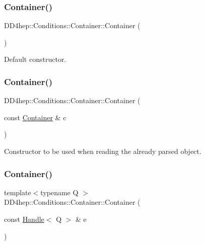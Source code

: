 \subsubsection{\texorpdfstring{Container()}{Container()}\hspace{0.1cm}{\footnotesize\ttfamily [1/3]}}
{\footnotesize\ttfamily D\+D4hep\+::\+Conditions\+::\+Container\+::\+Container (\begin{DoxyParamCaption}{ }\end{DoxyParamCaption})\hspace{0.3cm}{\ttfamily [default]}}



Default constructor. 

\hypertarget{class_d_d4hep_1_1_conditions_1_1_container_aafd4287ec4d43cc16b8ac5591ec4e75e}{}\label{class_d_d4hep_1_1_conditions_1_1_container_aafd4287ec4d43cc16b8ac5591ec4e75e} 
\subsubsection{\texorpdfstring{Container()}{Container()}\hspace{0.1cm}{\footnotesize\ttfamily [2/3]}}
{\footnotesize\ttfamily D\+D4hep\+::\+Conditions\+::\+Container\+::\+Container (\begin{DoxyParamCaption}\item[{const \hyperlink{class_d_d4hep_1_1_conditions_1_1_container}{Container} \&}]{c }\end{DoxyParamCaption})\hspace{0.3cm}{\ttfamily [default]}}



Constructor to be used when reading the already parsed object. 

\hypertarget{class_d_d4hep_1_1_conditions_1_1_container_a830ecf1eb136747f5e0698533b73685c}{}\label{class_d_d4hep_1_1_conditions_1_1_container_a830ecf1eb136747f5e0698533b73685c} 
\subsubsection{\texorpdfstring{Container()}{Container()}\hspace{0.1cm}{\footnotesize\ttfamily [3/3]}}
{\footnotesize\ttfamily template$<$typename Q $>$ \\
D\+D4hep\+::\+Conditions\+::\+Container\+::\+Container (\begin{DoxyParamCaption}\item[{const \hyperlink{class_d_d4hep_1_1_handle}{Handle}$<$ Q $>$ \&}]{e }\end{DoxyParamCaption})\hspace{0.3cm}{\ttfamily [inline]}}



